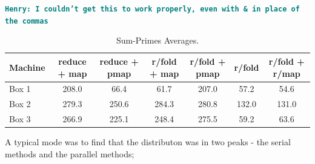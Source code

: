 \documentclass[12pt]{article}
\newcommand{\comment}[1]{{\bf \tt  {#1}}}
\newcommand{\hfcomment}[1]{\textcolor{Teal}{\comment{Henry: {#1}}}}
\begin{document}
\hfcomment{I couldn't get this to work properly, even with \& in place of the commas}
\begin{table}
\begin{center}
\begin{tabular}{|l|c|c|c|c|c|c|}
\hline
Machine & reduce + map & reduce + pmap & r/fold + map & r/fold + pmap & r/fold & r/fold + r/map \\
\hline
Box 1 & 208.0 & 66.4 & 61.7 & 207.0 & 57.2 &  54.6 \\
Box 2 & 279.3 & 250.6 & 284.3 & 280.8 & 132.0 & 131.0 \\
Box 3 & 266.9 & 225.1 & 248.4 & 275.5 & 59.2 & 63.6 \\
\hline
\end{tabular}
\end{center}
\caption{Sum-Primes Averages.}\label{table:sum-primes}
\end{table}
 
A typical mode was to find that the distributon was in two peaks - the serial methods and the parallel methods; 
\end{document}

